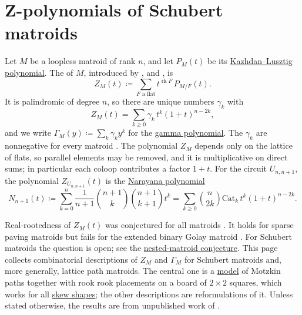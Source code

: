 


\section[schubertMatroidZ]{Z-polynomials of Schubert matroids}

Let $M$ be a loopless matroid of rank $n$, and let $P_M(t)$ be its
\hyperref[matroidKazhdanLusztigPolynomial]{Kazhdan--Lusztig polynomial}.
The \label{matroidZPolynomial} of $M$, introduced by
,  and 
\cite{ProudfootXuYoung2018}, is
\[
  Z_M(t) \coloneqq \sum_{F \text{ a flat}} t^{\operatorname{rk} F}\, P_{M/F}(t).
\]
It is palindromic of degree $n$, so there are unique numbers $\gamma_k$ with
\[
  Z_M(t)=\sum_{k\geq0}\gamma_k\, t^k(1+t)^{n-2k},
\]
and we write $\Gamma_M(y)\coloneqq\sum_k\gamma_k y^k$ for the
\hyperref[gammaPolynomial]{gamma polynomial}.  The $\gamma_k$ are nonnegative
for every matroid \cite[Thm.~1.8]{FerroniMatherneStevensVecchi2022x}.
The polynomial $Z_M$ depends only on the lattice of flats, so parallel
elements may be removed, and it is multiplicative on direct sums; in particular
each coloop contributes a factor $1+t$.  For the circuit $U_{n,n+1}$,
the polynomial $Z_{U_{n,n+1}}(t)$ is the \hyperref[narayanaNumbers]{Narayana polynomial}
\cite{ProudfootXuYoung2018}
\[
  N_{n+1}(t)\coloneqq
  \sum_{k=0}^{n}\frac{1}{n+1}\binom{n+1}{k}\binom{n+1}{k+1}t^k
  =\sum_{k\geq0}\binom{n}{2k}\mathrm{Cat}_k\, t^k(1+t)^{n-2k}.
\]

Real-rootedness of $Z_M(t)$ was conjectured for all matroids
\cite{ProudfootXuYoung2018}.  It holds for sparse paving matroids
\cite{XieZhang2026SparsePaving} but fails for the extended binary Golay matroid
\cite{Eberhardt2026x}.  For Schubert matroids the question is open; see the
\hyperref[conjNestedMatroidZ]{nested-matroid conjecture}.  This page collects
combinatorial descriptions of $Z_M$ and $\Gamma_M$ for Schubert matroids and,
more generally, lattice path matroids.  The central one is a
\hyperref[schubertMatroidZMotzkin]{model} of Motzkin paths together with rook
rook placements on a board of $2\times2$ squares, which works for all
\hyperref[schubertMatroidZSkew]{skew shapes}; the other descriptions are
reformulations of it.  Unless stated otherwise, the results
are from unpublished work of 
\cite{Alexandersson2026SchubertMatroidZ}.


